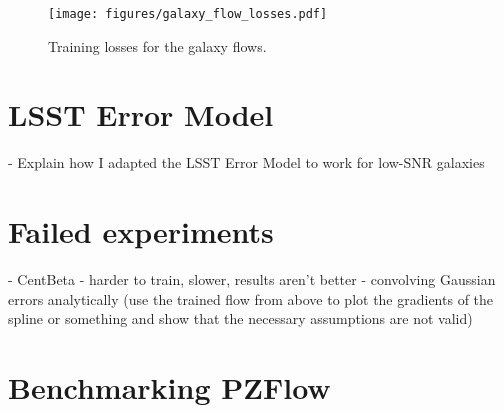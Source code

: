\documentclass[twocolumn]{aastex631}
\begin{document}
\begin{figure*}[t!]
    \begin{centering}
        \texttt{[image: figures/galaxy\_flow\_losses.pdf]}
        \caption{
            Training losses for the galaxy flows.
        }
        \label{fig:galaxy-flow-losses}
    \end{centering}
\end{figure*}

\section{LSST Error Model}

- Explain how I adapted the LSST Error Model to work for low-SNR galaxies

\section{Failed experiments}

- CentBeta - harder to train, slower, results aren't better
- convolving Gaussian errors analytically (use the trained flow from above to plot the gradients of the spline or something and show that the necessary assumptions are not valid)

\section{Benchmarking PZFlow}



\end{document}
